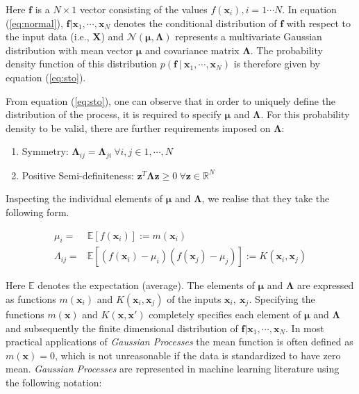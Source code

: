 Here $\mathbf{f}$ is a $N\times 1$ vector consisting of the values $f(\mathbf{x}_i), i = 1 \cdots N$. In equation (\ref{eq:normal}), $\mathbf{f}|\mathbf{x}_1, \cdots, \mathbf{x}_N$ denotes the conditional distribution of $\mathbf{f}$ with respect to the input data (i.e., $\mathbf{X}$) and $\mathcal{N}\left( \mathbf{\mu}, \mathbf{\Lambda} \right)$ represents a multivariate Gaussian distribution with mean vector $\mathbf{\mu}$ and covariance matrix $\mathbf{\Lambda}$. The probability density function of this distribution $p( \mathbf{f} \ | \ \mathbf{x}_1, \cdots, \mathbf{x}_N)$ is therefore given by equation (\ref{eq:sto}).

From equation (\ref{eq:sto}), one can observe that in order to uniquely define the distribution of the process, it is required to specify $\mathbf{\mu}$ and $\mathbf{\Lambda}$. For this probability density to be valid, there are further requirements imposed on $\mathbf{\Lambda}$: 


\begin{enumerate}
      \item Symmetry: $\mathbf{\Lambda}_{ij} = \mathbf{\Lambda}_{ji} \ \forall i,j \in {1, \cdots, N} $ 
      \item Positive Semi-definiteness: $\mathbf{z}^T \mathbf{\Lambda} \mathbf{z} \geq 0 \ \forall \mathbf{z} \in \mathbb{R}^N$  
\end{enumerate}

Inspecting the individual elements of $\mathbf{\mu}$ and $\mathbf{\Lambda}$, we realise that they take the following form.

\begin{align}
      \mu_i = & \mathbb{E}[f(\mathbf{x}_i)] := m(\mathbf{x}_i) \\
      \Lambda_{ij} = & \mathbb{E}[(f(\mathbf{x}_i) - \mu_i)(f(\mathbf{x}_j) - \mu_j)] := K(\mathbf{x}_i, \mathbf{x}_j)
\end{align}

Here $\mathbb{E}$ denotes the expectation (average). The elements of $\mathbf{\mu}$ and $\mathbf{\Lambda}$ are expressed as functions $m(\mathbf{x}_i)$ and $K(\mathbf{x}_i, \mathbf{x}_j)$ of the inputs $\mathbf{x}_i,\ \mathbf{x}_j$. Specifying the functions $m(\mathbf{x})$ and $K(\mathbf{x}, \mathbf{x}')$ completely specifies each element of $\mathbf{\mu}$ and $\mathbf{\Lambda}$ and subsequently the finite dimensional distribution of $\mathbf{f} | \mathbf{x}_1, \cdots, \mathbf{x}_N $. In most practical applications of \emph{Gaussian Processes} the mean function is often defined as $m(\mathbf{x}) = 0$, which is not unreasonable if the data is standardized to have zero mean. \emph{Gaussian Processes} are represented in machine learning literature using the following notation:

